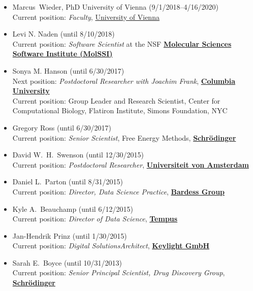 \documentclass[10pt]{article}
\begin{document}
\begin{itemize}
  \item Marcus~Wieder, PhD University of Vienna (9/1/2018--4/16/2020)\\
  Current position: \emph{Faculty}, \href{https://www.univie.ac.at/en/}{University of Vienna}
  
  \item Levi N. Naden (until 8/10/2018)\\
  Current position: \emph{Software Scientist} at the NSF \href{http://molssi.org}{\bf Molecular Sciences Software Institute (MolSSI)}
  
  \item Sonya M. Hanson (until 6/30/2017)\\
  Next position: \emph{Postdoctoral Researcher with Joachim Frank}, \href{http://franklab.cpmc.columbia.edu/franklab/}{{\bf Columbia University}}\\
  Current position: Group Leader and Research Scientist, Center for Computational Biology, Flatiron Institute, Simons Foundation, NYC
 
  \item Gregory Ross (until 6/30/2017)\\
  Current position: \emph{Senior Scientist}, Free Energy Methods, \href{http://www.schrodinger.com}{{\bf Schr\"{o}dinger}}
  
  \item David W.~H.~Swenson (until 12/30/2015)\\
  Current position: \emph{Postdoctoral Researcher}, \href{http://www.acmm.nl/molsim/users/swenson/index.html}{{\bf Universiteit von Amsterdam}}
  
  \item Daniel L.~Parton (until 8/31/2015)\\
  Current position: \emph{Director, Data Science Practice}, \href{http://www.bardess.com/}{{\bf Bardess Group}}
  
  \item Kyle A.~Beauchamp (until 6/12/2015)\\
  Current position: \emph{Director of Data Science}, \href{http://www.tempus.com}{{\bf Tempus}}
  
  \item Jan-Hendrik Prinz (until 1/30/2015)\\
  Current position: \emph{Digital SolutionsArchitect}, \href{http://www.keylight.de/}{{\bf Keylight GmbH}}
  
  \item Sarah E.~Boyce (until 10/31/2013)\\
  Current position: \emph{Senior Principal Scientist, Drug Discovery Group},  \href{http://www.schrodinger.com}{{\bf Schr\"{o}dinger}}

\end{itemize}
\end{document}
